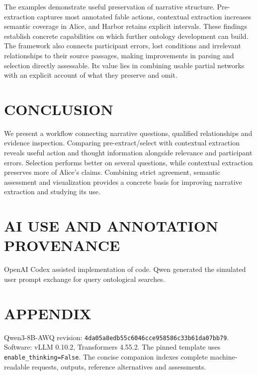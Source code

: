 \documentclass[a4paper,twoside]{article}
\begin{document}
The examples demonstrate useful preservation of narrative structure. Pre-extraction captures most annotated fable actions, contextual extraction increases semantic coverage in Alice, and Harbor retains explicit intervals. These findings establish concrete capabilities on which further ontology development can build. The framework also connects participant errors, lost conditions and irrelevant relationships to their source passages, making improvements in parsing and selection directly assessable. Its value lies in combining usable partial networks with an explicit account of what they preserve and omit.




\section{\uppercase{Conclusion}}
\noindent We present a workflow connecting narrative questions, qualified relationships and evidence inspection. Comparing pre-extract/select with contextual extraction reveals useful action and thought information alongside relevance and participant errors. Selection performs better on several questions, while contextual extraction preserves more of Alice's claims. Combining strict agreement, semantic assessment and visualization provides a concrete basis for improving narrative extraction and studying its use.

\section{\uppercase{AI Use and Annotation Provenance}}
\label{sec:disclosure}
\noindent OpenAI Codex \cite{openai2025} assisted implementation of code. Qwen generated the simulated user prompt exchange for query ontological searches.


{\small}
\section*{APPENDIX}
\noindent Qwen3-8B-AWQ revision: \texttt{4da05a8edb55c6046cce9585}\allowbreak\texttt{86c33b61da07bb79}. Software: vLLM 0.10.2, Transformers 4.55.2. The pinned template uses \texttt{enable\_thinking=False}. The concise companion indexes complete machine-readable requests, outputs, reference alternatives and assessments.
\end{document}
